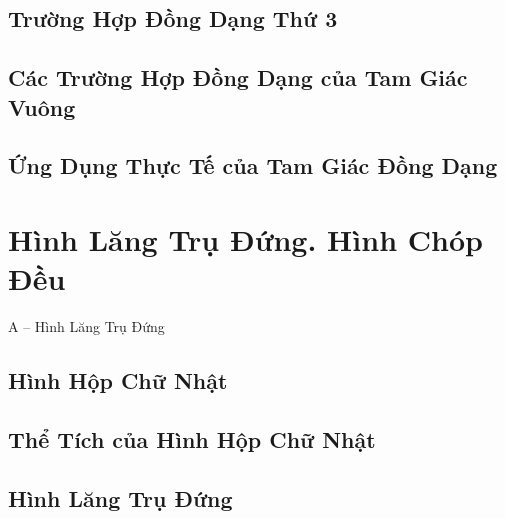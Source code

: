 \documentclass{article}
\numberwithin{equation}{section}
\begin{document}

\subsection{Trường Hợp Đồng Dạng Thứ 3}


\subsection{Các Trường Hợp Đồng Dạng của Tam Giác Vuông}


\subsection{Ứng Dụng Thực Tế của Tam Giác Đồng Dạng}


\section{Hình Lăng Trụ Đứng. Hình Chóp Đều}

\begin{center}
	\Large A -- Hình Lăng Trụ Đứng
\end{center}

\subsection{Hình Hộp Chữ Nhật}


\subsection{Thể Tích của Hình Hộp Chữ Nhật}


\subsection{Hình Lăng Trụ Đứng}
\end{document}
